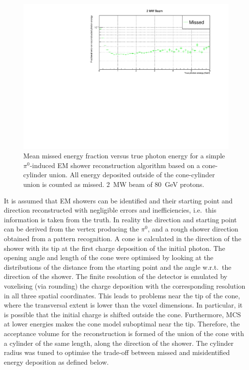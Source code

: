 \documentclass[a4paper]{article}
\begin{document}
\begin{figure}[tbp]
	\centering
	\includegraphics[width=\textwidth]{Figures/2MW/missed_rel_x}
	\caption[Pile-up study mean missed fractional vs.\ true photon energy, \SI{2}{\mega\watt} beam]{%
		Mean missed energy fraction versus true photon energy for a simple $\pi^0$-induced EM shower reconstruction algorithm based on a cone-cylinder union.
		All energy deposited outside of the cone-cylinder union is counted as missed.
		\SI{2}{\mega\watt} beam of \SI{80}{\giga\electronvolt} protons.
	}
	\label{fig:dune-nd_2MW_missed-rel-x}
\end{figure}

It is assumed that EM showers can be identified and their starting point and direction reconstructed with negligible errors and inefficiencies, i.e.\ this information is taken from the truth.
In reality the direction and starting point can be derived from the vertex producing the $\pi^0$, and a rough shower direction obtained from a pattern recognition.
A cone is calculated in the direction of the shower with its tip at the first charge deposition of the initial photon.
The opening angle and length of the cone were optimised by looking at the distributions of the distance from the starting point and the angle w.r.t.\ the direction of the shower.
The finite resolution of the detector is emulated by voxelising (via rounding) the charge deposition with the corresponding resolution in all three spatial coordinates.
This leads to problems near the tip of the cone, where the transversal extent is lower than the voxel dimensions.
In particular, it is possible that the initial charge is shifted outside the cone.
Furthermore, MCS at lower energies makes the cone model suboptimal near the tip.
Therefore, the acceptance volume for the reconstruction is formed of the union of the cone with a cylinder of the same length, along the direction of the shower.
The cylinder radius was tuned to optimise the trade-off between missed and misidentified energy deposition as defined below.
\end{document}
